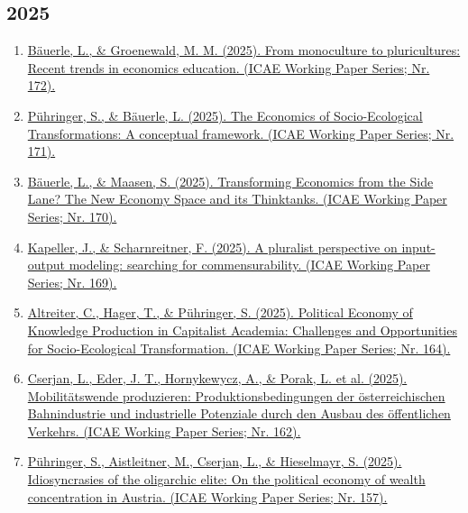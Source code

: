 \subsection*{2025}
\begin{enumerate}
	 \item \href{https://www.jku.at/fileadmin/gruppen/108/ICAE_Working_Papers/wp172.pdf}{Bäuerle, L., \& Groenewald, M. M. (2025). From monoculture to pluricultures: Recent trends in economics education. (ICAE Working Paper Series; Nr. 172).}
	 \item \href{https://www.jku.at/fileadmin/gruppen/108/ICAE_Working_Papers/wp171.pdf}{Pühringer, S., \& Bäuerle, L. (2025). The Economics of Socio-Ecological Transformations: A conceptual framework. (ICAE Working Paper Series; Nr. 171).}
	 \item \href{https://www.jku.at/fileadmin/gruppen/108/ICAE_Working_Papers/wp170.pdf}{Bäuerle, L., \& Maasen, S. (2025). Transforming Economics from the Side Lane? The New Economy Space and its Thinktanks. (ICAE Working Paper Series; Nr. 170).}
	 \item \href{https://www.jku.at/fileadmin/gruppen/108/ICAE_Working_Papers/wp169.pdf}{Kapeller, J., \& Scharnreitner, F. (2025). A pluralist perspective on input-output modeling: searching for commensurability. (ICAE Working Paper Series; Nr. 169).}
	 \item \href{https://www.jku.at/fileadmin/gruppen/108/ICAE_Working_Papers/wp164.pdf}{Altreiter, C., Hager, T., \& Pühringer, S. (2025). Political Economy of Knowledge Production in Capitalist Academia: Challenges and Opportunities for Socio-Ecological Transformation. (ICAE Working Paper Series; Nr. 164).}
	 \item \href{https://www.jku.at/fileadmin/gruppen/108/ICAE_Working_Papers/wp162.pdf}{Cserjan, L., Eder, J. T., Hornykewycz, A., \& Porak, L. et al. (2025). Mobilitätswende produzieren: Produktionsbedingungen der österreichischen Bahnindustrie und industrielle Potenziale durch den Ausbau des öffentlichen Verkehrs. (ICAE Working Paper Series; Nr. 162).}
	 \item \href{https://www.jku.at/fileadmin/gruppen/108/ICAE_Working_Papers/wp-157.pdf}{Pühringer, S., Aistleitner, M., Cserjan, L., \& Hieselmayr, S. (2025). Idiosyncrasies of the oligarchic elite: On the political economy of wealth concentration in Austria. (ICAE Working Paper Series; Nr. 157).}
\end{enumerate}
